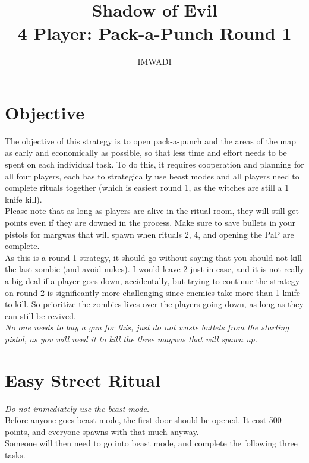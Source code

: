 \documentclass[11pt]{article} %
\title{Shadow of Evil \\ \Large 4 Player: Pack-a-Punch Round 1}
\author{IMWADI}
\begin{document}
\maketitle

\section*{Objective}

	The objective of this strategy is to open pack-a-punch and the areas of the map as early and economically as possible, so that less time and effort needs to be spent on each individual task. To do this, it requires cooperation and planning for all four players, each has to strategically use beast modes and all players need to complete rituals together (which is easiest round 1, as the witches are still a 1 knife kill). \\
	Please note that as long as players are alive in the ritual room, they will still get points even if they are downed in the process. Make sure to save bullets in your pistols for margwas that will spawn when rituals 2, 4, and opening the PaP are complete. \\
	As this is a round 1 strategy, it should go without saying that you should not kill the last zombie (and avoid nukes). I would leave 2 just in case, and it is not really a big deal if a player goes down, accidentally, but trying to continue the strategy on round 2 is significantly more challenging since enemies take more than 1 knife to kill. So prioritize the zombies lives over the players going down, as long as they can still be revived. \\
	\emph{No one needs to buy a gun for this, just do not waste bullets from the starting pistol, as you will need it to kill the three magwas that will spawn up.}

\newpage
\section{Easy Street Ritual}

	\emph{Do not immediately use the beast mode.}\\
	
	Before anyone goes beast mode, the first door should be opened. It cost 500 points, and everyone spawns with that much anyway. \\

	Someone will then need to go into beast mode, and complete the following three tasks.
\end{document}
